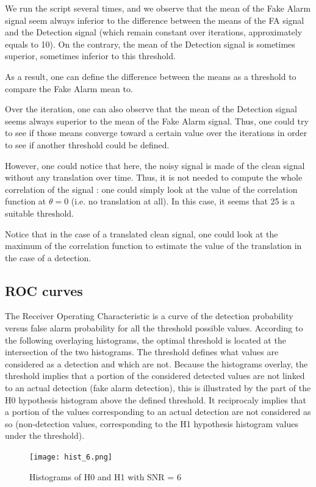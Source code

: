 We run the script several times, and we observe that the mean of the Fake Alarm signal seem always inferior to the difference between the means of the FA signal and the Detection signal (which remain constant over iterations, approximately equals to 10). On the contrary, the mean of the Detection signal is sometimes superior, sometimes inferior to this threshold.

As a result, one can define the difference between the means as a threshold to compare the Fake Alarm mean to.

Over the iteration, one can also observe that the mean of the Detection signal seems always superior to the mean of the Fake Alarm signal. Thus, one could try to see if those means converge toward a certain value over the iterations in order to see if another threshold could be defined.

However, one could notice that here, the noisy signal is made of the clean signal without any translation over time. Thus, it is not needed to compute the whole correlation of the signal : one could simply look at the value of the correlation function at $\theta = 0 $ (i.e. no translation at all). In this case, it seems that 25 is a suitable threshold.

Notice that in the case of a translated clean signal, one could look at the maximum of the correlation function to estimate the value of the translation in the case of a detection.

\subsection{ROC curves}
The Receiver Operating Characteristic is a curve of the detection probability versus false alarm probability for all the threshold possible values. According to the following overlaying histograms, the optimal threshold is located at the intersection of the two histograms. The threshold defines what values are considered as a detection and which are not. Because the histograms overlay, the threshold implies that a portion of the considered detected values are not linked to an actual detection (fake alarm detection), this is illustrated by the part of the H0 hypothesis histogram above the defined threshold. It reciprocaly implies that a portion of the values corresponding to an actual detection are not considered as so (non-detection values, corresponding to the H1 hypothesis histogram values under the threshold).

\begin{figure}[h]
	\centering
	\texttt{[image: hist\_6.png]}
	\caption{Histograms of H0 and H1 with SNR = 6}
	\label{fig:hist6}
\end{figure}


